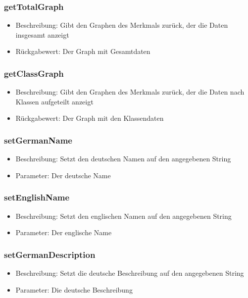 \documentclass[a4paper]{scrreprt}
\begin{document}
    \subsubsection{getTotalGraph}
    \begin{itemize}
        \item Beschreibung: Gibt den Graphen des Merkmals zurück, der die Daten insgesamt anzeigt
        \item Rückgabewert: Der Graph mit Gesamtdaten
    \end{itemize}
    \subsubsection{getClassGraph}
    \begin{itemize}
        \item Beschreibung: Gibt den Graphen des Merkmals zurück, der die Daten nach Klassen aufgeteilt anzeigt
        \item Rückgabewert: Der Graph mit den Klassendaten
    \end{itemize}
    \subsubsection{setGermanName}
    \begin{itemize}
        \item Beschreibung: Setzt den deutschen Namen auf den angegebenen String
        \item Parameter: Der deutsche Name
    \end{itemize}
    \subsubsection{setEnglishName}
    \begin{itemize}
        \item Beschreibung: Setzt den englischen Namen auf den angegebenen String
        \item Parameter: Der englische Name
    \end{itemize}
    \subsubsection{setGermanDescription}
    \begin{itemize}
        \item Beschreibung: Setzt die deutsche Beschreibung auf den angegebenen String
        \item Parameter: Die deutsche Beschreibung
    \end{itemize}
\end{document}
